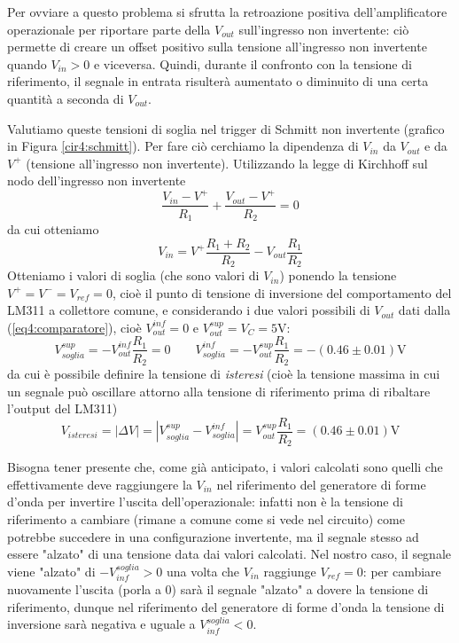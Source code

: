 Per ovviare a questo problema si sfrutta la retroazione positiva dell'amplificatore operazionale per riportare parte della $V_{out}$ sull'ingresso non invertente: ciò permette di creare un offset positivo sulla tensione all'ingresso non invertente quando $V_{in}>0$ e viceversa.
Quindi, durante il confronto con la tensione di riferimento, il segnale in entrata risulterà aumentato o diminuito di una certa quantità a seconda di $V_{out}$.

Valutiamo queste tensioni di soglia nel trigger di Schmitt non invertente (grafico in Figura \ref{cir4:schmitt}).
Per fare ciò cerchiamo la dipendenza di $V_{in}$ da $V_{out}$ e da $V^+$ (tensione all'ingresso non invertente). Utilizzando la legge di Kirchhoff sul nodo dell'ingresso non invertente
$$\frac{V_{in}-V^+}{R_1} + \frac{V_{out}-V^+}{R_2} = 0$$
da cui otteniamo
\begin{equation}
V_{in} = V^+ \frac{R_1+R_2}{R_2} - V_{out} \frac{R_1}{R_2}
\label{eq4:v_in_parte2}
\end{equation}
Otteniamo i valori di soglia (che sono valori di $V_{in}$) ponendo la tensione $V^+=V^-=V_{ref}=0$, cioè il punto di tensione di inversione del comportamento del LM311 a collettore comune, e considerando i due valori possibili di $V_{out}$ dati dalla (\ref{eq4:comparatore}), cioè $V_{out}^{inf}=0$ e $V_{out}^{sup}=V_{C}=5$\si{\volt}:
\begin{equation}
V_{soglia}^{sup} = - V_{out}^{inf} \frac{R_1}{R_2} = 0 \qquad V_{soglia}^{inf} = - V_{out}^{sup} \frac{R_1}{R_2} = - (0.46 \pm 0.01) \si{\volt}
\label{eq4:punti}
\end{equation}
da cui è possibile definire la tensione di \textit{isteresi} (cioè la tensione massima in cui un segnale può oscillare attorno alla tensione di riferimento prima di ribaltare l'output del LM311)
$$V_{isteresi} = |\Delta V| = |V_{soglia}^{sup} - V_{soglia}^{inf}| = V_{out}^{sup} \frac{R_1}{R_2} = (0.46 \pm 0.01) \si{\volt}$$

Bisogna tener presente che, come già anticipato, i valori calcolati sono quelli che effettivamente deve raggiungere la $V_{in}$ nel riferimento del generatore di forme d'onda per invertire l'uscita dell'operazionale: infatti non è la tensione di riferimento a cambiare (rimane a comune come si vede nel circuito) come potrebbe succedere in una configurazione invertente, ma il segnale stesso ad essere "alzato" di una tensione data dai valori calcolati. Nel nostro caso, il segnale viene "alzato" di $-V_{inf}^{soglia}>0$ una volta che $V_{in}$ raggiunge $V_{ref}=0$: per cambiare nuovamente l'uscita (porla a 0) sarà il segnale "alzato" a dovere la tensione di riferimento, dunque nel riferimento del generatore di forme d'onda la tensione di inversione sarà negativa e uguale a $V_{inf}^{soglia}<0$.

